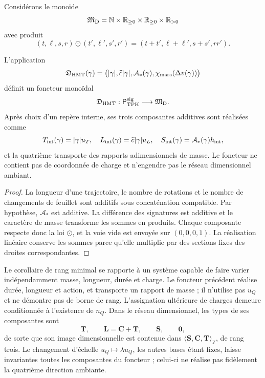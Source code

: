 Considérons le monoïde
\[
 \mathfrak M_{\rm D}
 =\mathbb N\times\mathbb R_{\ge0}\times
  \mathbb R_{\ge0}\times\mathbb R_{>0}
\]
avec produit
\[
 (t,\ell,s,r)\odot(t',\ell',s',r')
 =(t+t',\ell+\ell',s+s',rr').
\]

\begin{theorem}
\label{thm:funtor-dimensional-minimo}
L'application
\[
 \mathfrak D_{\rm HMT}(\gamma)
 =\bigl(
 |\gamma|,
 \widehat c|\gamma|,
 \mathcal A_*(\gamma),
 \chi_{\rm mass}(\Delta v(\gamma))
 \bigr)
\]
définit un foncteur monoïdal
\[
 \mathfrak D_{\rm HMT}:
 \mathsf P_{\rm TPK}^{\rm sig}\longrightarrow\mathfrak M_{\rm D}.
\]
Après choix d'un repère interne, ses trois composantes additives sont réalisées
comme
\[
 T_{\rm int}(\gamma)=|\gamma|u_T,
 \quad
 L_{\rm int}(\gamma)=\widehat c|\gamma|u_L,
 \quad
 S_{\rm int}(\gamma)=\mathcal A_*(\gamma)\hbar_{\rm int},
\]
et la quatrième transporte des rapports adimensionnels de masse. Le foncteur ne contient pas
de coordonnée de charge et n'engendre pas le réseau dimensionnel ambiant.
\end{theorem}

\begin{proof}
La longueur d'une trajectoire, le nombre de rotations et le nombre de changements de
feuillet sont additifs sous concaténation compatible. Par hypothèse,
\(\mathcal A_*\) est additive. La différence des signatures est additive et le caractère
de masse transforme les sommes en produits. Chaque composante respecte donc
la loi \(\odot\), et la voie vide est envoyée sur
\((0,0,0,1)\). La réalisation linéaire conserve les sommes parce qu'elle multiplie
par des sections fixes des droites correspondantes.
\end{proof}

\begin{remark}
Le corollaire de rang minimal se rapporte à un système capable de faire varier
indépendamment masse, longueur, durée et charge. Le foncteur précédent
réalise durée, longueur et action, et transporte un rapport de masse ; il n'utilise pas
\(u_Q\) et ne démontre pas de borne de rang. L'assignation ultérieure de charges
demeure conditionnée à l'existence de \(n_Q\). Dans le réseau dimensionnel,
les types de ses composantes sont
\[
 \mathbf T,\qquad \mathbf L=\mathbf C+\mathbf T,\qquad
 \mathbf S,\qquad \mathbf0,
\]
de sorte que son image dimensionnelle est contenue dans
\(\langle\mathbf S,\mathbf C,\mathbf T\rangle_{\mathbb Z}\), de rang trois.
Le changement d'échelle \(u_Q\mapsto\lambda u_Q\), les autres bases étant fixes, laisse
invariantes toutes les composantes du foncteur ; celui-ci ne réalise pas fidèlement la
quatrième direction ambiante.
\end{remark}

